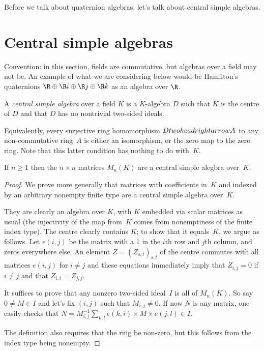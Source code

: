 Before we talk about quaternion algebras, let's talk about central simple algebras.

\section{Central simple algebras}

Convention: in this section, fields are commutative, but algebras over a field may not be. An example
of what we are considering below would be Hamilton's quaternions $\R\oplus\R i\oplus\R j\oplus\R k$ as an algebra over $\R$.


\begin{definition}
    \label{IsCentralSimple}
    \leanok
A \emph{central simple algebra} over a field $K$ is a $K$-algebra $D$ such that $K$ is the centre of $D$
and that $D$ has no nontrivial two-sided ideals.
\end{definition}

Equivalently, every surjective ring homomorphism $D\\twoheadrightarrow A$ to any non-commutative ring~$A$
is either an isomorphism, or the zero map to the zero ring. Note that this latter condition has nothing
to do with~$K$.

\begin{lemma}
    \label{MatrixRing.isCentralSimple}
    If $n\geq1$ then the $n\times n$ matrices $M_n(K)$ are a central simple alegbra over~$K$.
\end{lemma}
\begin{proof}
We prove more generally that matrices with coefficients in~$K$ and indexed by an arbitrary nonempty 
finite type are a central simple algebra over~$K$.

They are clearly an algebra over $K$, with $K$ embedded via scalar matrices as usual
(the injectivity of the map from~$K$ comes from nonemptiness of the finite index type). 
The centre clearly contains $K$; to show that it
equals~$K$, we argue as follows. Let $e(i,j)$ be the matrix with a 1 in the $i$th row and $j$th
column, and zeros everywhere else. An element $Z=(Z_{s,t})_{s,t}$ of the centre commutes with 
all matrices $e(i,j)$ for $i\not=j$ and these equations immediately imply that $Z_{i,j}=0$ if $i\not=j$
and that $Z_{i,i}=Z_{j,j}$.

It suffices to prove that any nonzero two-sided ideal~$I$ is all of $M_n(K)$. So say $0\not=M\in I$
and let's fix $(i,j)$ such that $M_{i,j}\not=0$. If now $N$ is any matrix, one easily checks
that $N=M_{i,j}^{-1}\sum_{k,l}e(k,i)\times M\times e(j,l)\in I$.

The definition also requires that the ring be non-zero, but this follows from the index type being nonempty.
\end{proof}

